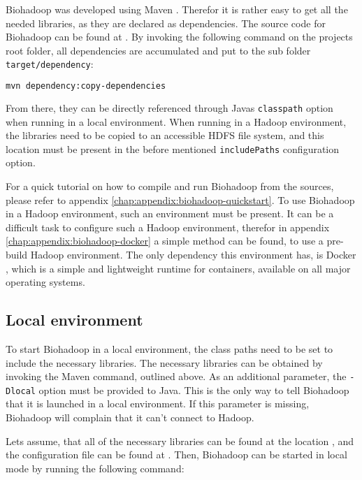 Biohadoop was developed using Maven \cite{maven}. Therefor it is rather easy to get all the needed libraries, as they are declared as dependencies. The source code for Biohadoop can be found at \cite{biohadoop}. By invoking the following command on the projects root folder, all dependencies are accumulated and put to the sub folder \texttt{target/dependency}:

\begin{lstlisting}[language=bash]
mvn dependency:copy-dependencies
\end{lstlisting}

From there, they can be directly referenced through Javas \texttt{classpath} option when running in a local environment. When running in a Hadoop environment, the libraries need to be copied to an accessible HDFS file system, and this location must be present in the before mentioned \texttt{includePaths} configuration option.

For a quick tutorial on how to compile and run Biohadoop from the sources, please refer to appendix \ref{chap:appendix:biohadoop-quickstart}. To use Biohadoop in a Hadoop environment, such an environment must be present. It can be a difficult task to configure such a Hadoop environment, therefor in appendix \ref{chap:appendix:biohadoop-docker} a simple method can be found, to use a pre-build Hadoop environment. The only dependency this environment has, is Docker \cite{docker}, which is a simple and lightweight runtime for containers, available on all major operating systems.

  \subsection{Local environment}
  \label{chap:usage:local}
  To start Biohadoop in a local environment, the class paths need to be set to include the necessary libraries. The necessary libraries can be obtained by invoking the Maven command, outlined above. As an additional parameter, the \texttt{-Dlocal} option must be provided to Java. This is the only way to tell Biohadoop that it is launched in a local environment. If this parameter is missing, Biohadoop will complain that it can't connect to Hadoop.
  
  Lets assume, that all of the necessary libraries can be found at the location , and the configuration file can be found at . Then, Biohadoop can be started in local mode by running the following command:
  
